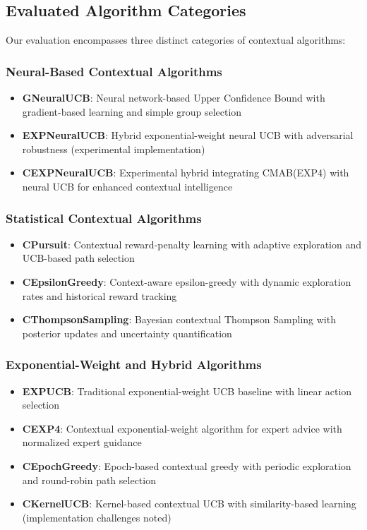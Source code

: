 \documentclass[12pt,a4paper]{article}
\begin{document}
\subsection{Evaluated Algorithm Categories}

Our evaluation encompasses three distinct categories of contextual algorithms:

\subsubsection{Neural-Based Contextual Algorithms}
\begin{itemize}
\item \textbf{GNeuralUCB}: Neural network-based Upper Confidence Bound with gradient-based learning and simple group selection
\item \textbf{EXPNeuralUCB}: Hybrid exponential-weight neural UCB with adversarial robustness (experimental implementation)
\item \textbf{CEXPNeuralUCB}: Experimental hybrid integrating CMAB(EXP4) with neural UCB for enhanced contextual intelligence
\end{itemize}

\subsubsection{Statistical Contextual Algorithms}
\begin{itemize}
\item \textbf{CPursuit}: Contextual reward-penalty learning with adaptive exploration and UCB-based path selection
\item \textbf{CEpsilonGreedy}: Context-aware epsilon-greedy with dynamic exploration rates and historical reward tracking
\item \textbf{CThompsonSampling}: Bayesian contextual Thompson Sampling with posterior updates and uncertainty quantification
\end{itemize}

\subsubsection{Exponential-Weight and Hybrid Algorithms}
\begin{itemize}
\item \textbf{EXPUCB}: Traditional exponential-weight UCB baseline with linear action selection
\item \textbf{CEXP4}: Contextual exponential-weight algorithm for expert advice with normalized expert guidance
\item \textbf{CEpochGreedy}: Epoch-based contextual greedy with periodic exploration and round-robin path selection
\item \textbf{CKernelUCB}: Kernel-based contextual UCB with similarity-based learning (implementation challenges noted)
\end{itemize}
\end{document}
